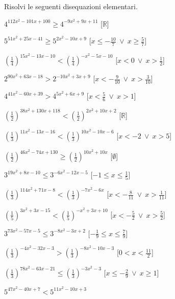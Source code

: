 \begin{esercizio}\label{ese:}
 Risolvi le seguenti disequazioni elementari.
 \begin{enumeratea}
  \item  \(4^{112 x^2 -101 x +100} \geqslant 4^{-9 x^2 +9 x +11}\)
   \hfill [\(\mathbb{R}\)]
  \item  \(5^{51 x^2 +25 x -41} \geqslant 5^{2 x^2 -10 x +9}\)
   \hfill [\(x \leqslant -\frac{10}{7}~\vee~x \geqslant \frac{5}{7}\)]
  \item  \(\left(\frac{1}{4}\right)^{15 x^2 -13 x -10} < 
\left(\frac{1}{4}\right)^{- x^2 -5 x -10}\)
   \hfill [\(x < 0~\vee~x > \frac{1}{2}\)]
  \item  \(2^{90 x^2 +63 x -18} > 2^{-10 x^2 +3 x +9}\)
   \hfill [\(x < -\frac{9}{10}~\vee~x > \frac{3}{10}\)]
  \item  \(4^{41 x^2 -60 x +39} > 4^{5 x^2 +6 x +9}\)
   \hfill [\(x < \frac{5}{6}~\vee~x > 1\)]
  \item  \(\left(\frac{1}{2}\right)^{38 x^2 +130 x +118} < 
\left(\frac{1}{2}\right)^{2 x^2 +10 x +2}\)
   \hfill [\(\mathbb{R}\)]
  \item  \(\left(\frac{1}{3}\right)^{11 x^2 -13 x -16} < 
\left(\frac{1}{3}\right)^{10 x^2 -10 x -6}\)
   \hfill [\(x < -2~\vee~x > 5\)]
  \item  \(\left(\frac{1}{2}\right)^{46 x^2 -74 x +130} \geqslant 
\left(\frac{1}{2}\right)^{10 x^2 +10 x }\)
   \hfill [\(\emptyset\)]
  \item  \(3^{19 x^2 +8 x -10} \leqslant 3^{-6 x^2 -12 x -5}\)
   \hfill [\(-1 \leqslant x \leqslant \frac{1}{5}\)]
  \item  \(\left(\frac{1}{3}\right)^{114 x^2 +71 x -8} < 
\left(\frac{1}{3}\right)^{-7 x^2 -6 x }\)
   \hfill [\(x < -\frac{8}{11}~\vee~x > \frac{1}{11}\)]
  \item  \(\left(\frac{1}{5}\right)^{3 x^2 +3 x -15} < 
\left(\frac{1}{5}\right)^{- x^2 +3 x +10}\)
   \hfill [\(x < -\frac{5}{2}~\vee~x > \frac{5}{2}\)]
  \item  \(3^{73 x^2 -57 x -5} \leqslant 3^{-8 x^2 -3 x +2}\)
   \hfill [\(-\frac{1}{9} \leqslant x \leqslant \frac{7}{9}\)]
  \item  \(\left(\frac{1}{3}\right)^{-4 x^2 -32 x -3} > 
\left(\frac{1}{3}\right)^{-8 x^2 -10 x -3}\)
   \hfill [\(0 < x < \frac{11}{2}\)]
  \item  \(\left(\frac{1}{3}\right)^{78 x^2 -63 x -21} \leqslant 
\left(\frac{1}{3}\right)^{-3 x^2 -3}\)
   \hfill [\(x \leqslant -\frac{2}{9}~\vee~x \geqslant 1\)]
  \item  \(5^{47 x^2 -40 x +7} < 5^{11 x^2 -10 x +3}\)

\end{enumeratea}
\end{esercizio}
